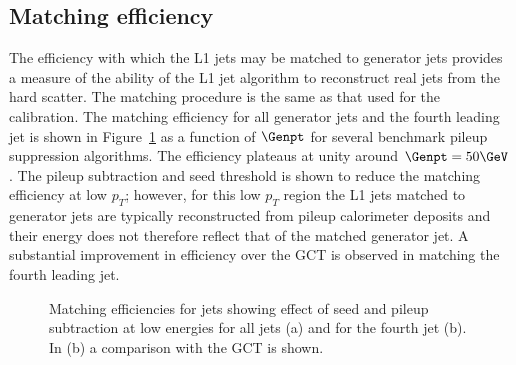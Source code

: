 \subsection{Matching efficiency}

The efficiency with which the L1 jets may be matched to generator jets provides a measure of the ability of the L1 jet algorithm 
to reconstruct real jets from the hard scatter. The matching procedure is the same as that used for the calibration. 
The matching efficiency for all generator jets and the fourth leading jet is shown 
in Figure~\ref{fig:match} as a function of $\Genpt$ for several benchmark pileup suppression algorithms. 
The efficiency plateaus at unity around $\Genpt=50 \GeV$. The pileup subtraction and seed threshold is shown to reduce
the matching efficiency at low $p_T$; however, for this low $p_T$ region the L1 jets matched to generator jets are typically
reconstructed from pileup calorimeter deposits and their energy does not therefore
reflect that of the matched generator jet. A substantial improvement in efficiency over the GCT is observed in 
matching the fourth leading jet.





\begin{figure}
\begin{center}
\caption{Matching efficiencies for jets showing effect of seed and pileup subtraction at low energies for all jets (a) and for the fourth jet (b). In (b)
a comparison with the GCT is shown.}
\label{fig:match}
\end{center}
\end{figure}


